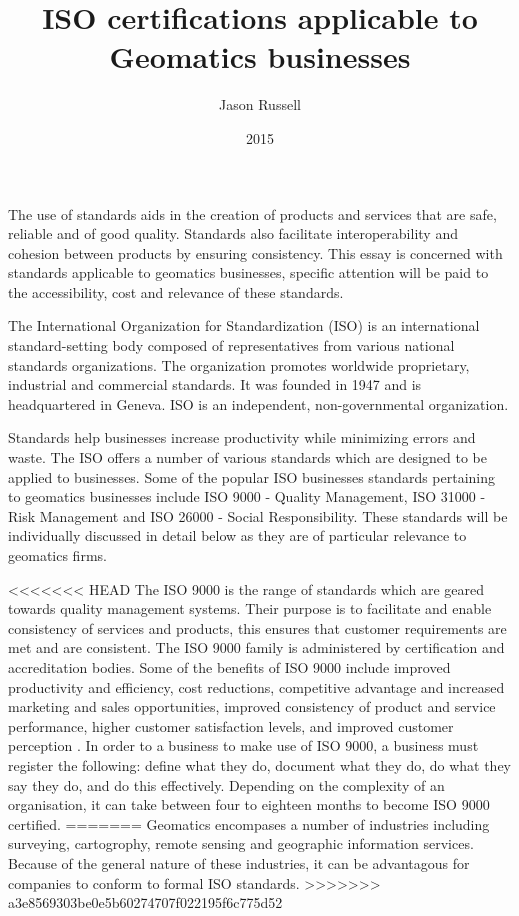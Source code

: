 \documentclass[11pt,a4paper]{article}
\title{ISO certifications applicable to Geomatics businesses}
\date{2015}
\author{Jason Russell}
\begin{document}
\maketitle

\newpage

The use of standards aids in the creation of products and services that are safe, reliable and of good quality.  Standards also facilitate interoperability and cohesion between products by ensuring consistency. This essay is concerned with standards applicable to geomatics businesses, specific attention will be paid to the accessibility, cost and relevance of these standards.

\vspace{5mm}

The International Organization for Standardization (ISO) is an international standard-setting body composed of representatives from various national standards organizations. The organization promotes worldwide proprietary, industrial and commercial standards. It was founded in 1947 and is headquartered in Geneva. ISO is an independent, non-governmental organization.

\vspace{5mm}

Standards help businesses increase productivity while minimizing errors and waste. The ISO offers a number of various standards which are designed to be applied to businesses. Some of the popular ISO businesses standards pertaining to geomatics businesses include ISO 9000 - Quality Management, ISO 31000 - Risk Management and ISO 26000 - Social Responsibility. These standards will be individually discussed in detail below as they are of particular relevance to geomatics firms.

\vspace{5mm}

<<<<<<< HEAD
The ISO 9000 is the range of standards which are geared towards quality management systems. Their purpose is to facilitate and enable consistency of services and products, this ensures that customer requirements are met and are consistent. The ISO 9000 family is administered by certification and accreditation bodies. Some of the benefits of ISO 9000 include improved productivity and efficiency, cost reductions, competitive advantage and increased marketing and sales opportunities, improved consistency of product and service performance, higher customer satisfaction levels, and improved customer perception \cite{_get_????}. In order to a business to make use of ISO 9000, a business must register the following: define what they do, document what they do, do what they say they do, and do this effectively. Depending on the complexity of an organisation, it can take between four to eighteen months to become ISO 9000 certified.
=======
Geomatics encompases a number of industries including surveying, cartogrophy, remote sensing and geographic information services. Because of the general nature of these industries, it can be advantagous for companies to conform to formal ISO standards.
>>>>>>> a3e8569303be0e5b60274707f022195f6c775d52
\end{document}
